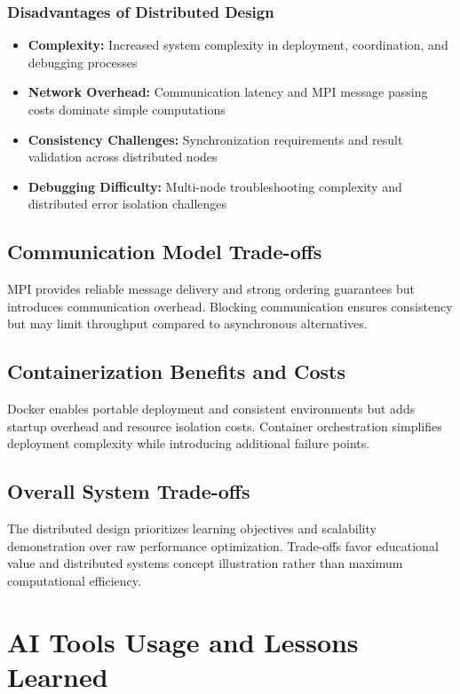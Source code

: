 \documentclass{article}
\begin{document}
\subsubsection{Disadvantages of Distributed Design}
\begin{itemize}
    \item \textbf{Complexity:} Increased system complexity in deployment, coordination, and debugging processes
    \item \textbf{Network Overhead:} Communication latency and MPI message passing costs dominate simple computations
    \item \textbf{Consistency Challenges:} Synchronization requirements and result validation across distributed nodes
    \item \textbf{Debugging Difficulty:} Multi-node troubleshooting complexity and distributed error isolation challenges
\end{itemize}

\subsection{Communication Model Trade-offs}
MPI provides reliable message delivery and strong ordering guarantees but introduces communication overhead. Blocking communication ensures consistency but may limit throughput compared to asynchronous alternatives.

\subsection{Containerization Benefits and Costs}
Docker enables portable deployment and consistent environments but adds startup overhead and resource isolation costs. Container orchestration simplifies deployment complexity while introducing additional failure points.

\subsection{Overall System Trade-offs}
The distributed design prioritizes learning objectives and scalability demonstration over raw performance optimization. Trade-offs favor educational value and distributed systems concept illustration rather than maximum computational efficiency.


\section{AI Tools Usage and Lessons Learned}
\end{document}
